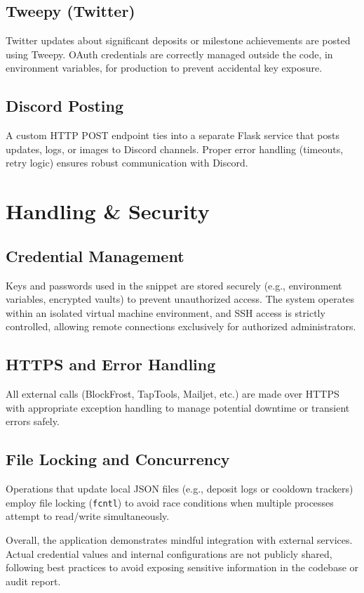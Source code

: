 \documentclass[11pt,a4paper]{report}
\begin{document}
\subsection{Tweepy (Twitter)}
Twitter updates about significant deposits or milestone achievements are posted using Tweepy. OAuth credentials are correctly managed outside the code, in environment variables, for production to prevent accidental key exposure.

\subsection{Discord Posting}
A custom HTTP POST endpoint ties into a separate Flask service that posts updates, logs, or images to Discord channels. Proper error handling (timeouts, retry logic) ensures robust communication with Discord.

\section{Handling \& Security}

\subsection{Credential Management}
Keys and passwords used in the snippet are stored securely (e.g., environment variables, encrypted vaults) to prevent unauthorized access. The system operates within an isolated virtual machine environment, and SSH access is strictly controlled, allowing remote connections exclusively for authorized administrators.

\subsection{HTTPS and Error Handling}
All external calls (BlockFrost, TapTools, Mailjet, etc.) are made over HTTPS with appropriate exception handling to manage potential downtime or transient errors safely.

\subsection{File Locking and Concurrency}
Operations that update local JSON files (e.g., deposit logs or cooldown trackers) employ file locking (\texttt{fcntl}) to avoid race conditions when multiple processes attempt to read/write simultaneously.

Overall, the application demonstrates mindful integration with external services. Actual credential values and internal configurations are not publicly shared, following best practices to avoid exposing sensitive information in the codebase or audit report.
\end{document}
